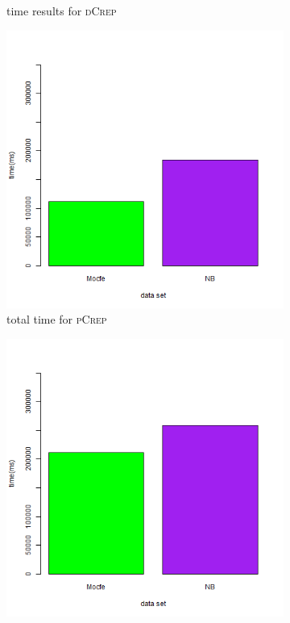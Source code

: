 \documentclass[a4paper,UKenglish,cleveref, autoref, thm-restate,authorcolumns]{lipics-v2019}
\newcommand{\adjDel}{\textsc{pCrep}}
\newcommand{\directDecomp}{\textsc{dCrep}}
\begin{document}
\begin{figure}
\begin{minipage}{0.48\linewidth}
\begin{subfigure}[b]{\linewidth}
			\caption{time results for \directDecomp}
		\end{subfigure}		
	\end{minipage}
	\begin{minipage}{0.48\linewidth}
		\begin{subfigure}[b]{\linewidth}
			\includegraphics*[width=\linewidth]{"plots/barplot_time_hpc_filtered_decompTree"}
			\caption{total time for \adjDel}
		\end{subfigure}		
	\end{minipage}
	\begin{minipage}{0.48\linewidth}
		\begin{subfigure}[b]{\linewidth}
			\includegraphics*[width=\linewidth]{"plots/barplot_time_hpc_filtered_compDecomp"}

\end{subfigure}
\end{minipage}
\end{figure}
\end{document}
